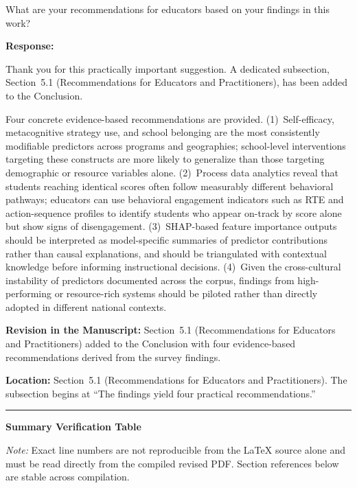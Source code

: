 \documentclass[12pt, a4paper]{article}
\begin{document}
\medskip
\noindent\textcolor{reviewerblue}{%
What are your recommendations for educators based on your findings in this work?}

\medskip
\noindent\textbf{Response:}

Thank you for this practically important suggestion. A dedicated subsection, Section~5.1
(Recommendations for Educators and Practitioners), has been added to the Conclusion.

Four concrete evidence-based recommendations are provided. (1)~Self-efficacy, metacognitive
strategy use, and school belonging are the most consistently modifiable predictors across programs
and geographies; school-level interventions targeting these constructs are more likely to generalize
than those targeting demographic or resource variables alone. (2)~Process data analytics reveal
that students reaching identical scores often follow measurably different behavioral pathways;
educators can use behavioral engagement indicators such as RTE and action-sequence profiles to
identify students who appear on-track by score alone but show signs of disengagement.
(3)~SHAP-based feature importance outputs should be interpreted as model-specific summaries of
predictor contributions rather than causal explanations, and should be triangulated with contextual
knowledge before informing instructional decisions. (4)~Given the cross-cultural instability of
predictors documented across the corpus, findings from high-performing or resource-rich systems
should be piloted rather than directly adopted in different national contexts.

\medskip
\noindent\textbf{Revision in the Manuscript:}
Section~5.1 (Recommendations for Educators and Practitioners) added to the Conclusion with four
evidence-based recommendations derived from the survey findings.

\medskip
\noindent\textbf{Location:} Section~5.1 (Recommendations for Educators and Practitioners). The
subsection begins at ``The findings yield four practical recommendations.''

\bigskip\hrule\bigskip

\newpage


\noindent\textbf{\large Summary Verification Table}

\medskip
\noindent\textit{Note:} Exact line numbers are not reproducible from the LaTeX source alone and
must be read directly from the compiled revised PDF. Section references below are stable across
compilation.
\end{document}
